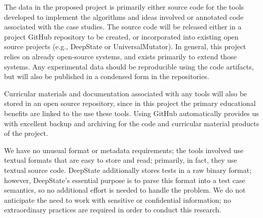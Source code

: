 \documentclass[12pt]{article}
\begin{document}
\begin{center}
{\large\sf\textbf{\proptitle}}
\end{center}

The data in the proposed project is primarily either source code for
the tools developed to implement the algorithms and ideas involved or
annotated code associated with the case studies.  The source code will
be released either in a project GitHub repository to be created, or
incorporated into existing open source projects (e.g., DeepState or UniversalMutator).   In general, this project relies on already open-source systems, and exists primarily to extend those systems.  Any experimental data should be reproducible using the code artifacts, but will also be published in a condensed form in the repositories.

Curricular
materials and documentation associated with any tools will also be stored in
an open source repository, since in this project the primary
educational benefits are linked to the use these tools.  Using GitHub automatically provides us with excellent backup
and archiving for the code and curricular material products of the
project.

We have no unusual format or metadata requirements; the
tools involved use textual formats that are easy to store and read;
primarily, in fact, they use textual source code.  DeepState additionally stores tests in a raw binary format; however, DeepState's essential purpose is to parse this format into a test case semantics, so no additional effort is needed to handle the problem.  
We do not anticipate the need to work with sensitive or confidential
information; no extraordinary practices are required in order to
conduct this research.
\end{document}
